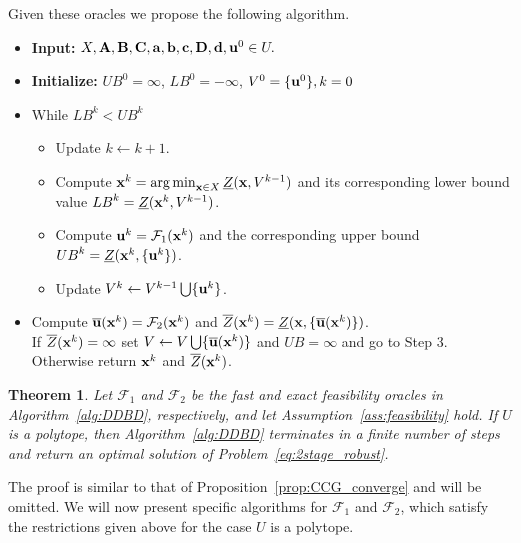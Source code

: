 \documentclass[12pt,x11names]{article}
\newtheorem{theorem}{Theorem} %
\theoremstyle{definition}
\newcommand{\ba}{{\bf a}}
\newcommand{\bb}{{\bf b}}
\newcommand{\bc}{{\bf c}}
\newcommand{\bd}{{\bf d}}
\newcommand{\bu}{{\bf u}}
\newcommand{\bx}{{\bf x}}
\newcommand{\bba}{{\bf A}}
\newcommand{\bbb}{{\bf B}}
\newcommand{\bbc}{{\bf C}}
\newcommand{\bbd}{{\bf D}}
\DeclareMathOperator*{\argmin}{arg\,min}
\begin{document}
Given these oracles we propose the following algorithm. %
\begin{algorithm}\caption{Duality Driven Bender Decomposition (DDBD)}\label{alg:DDBD}
		\begin{itemize}
				\item[$\rm{(1)}$] {\bf Input:} $X,\bba,\bbb,\bbc,\ba,\bb,\bc,\bbd,\bd,\bu^0\in U.$
			    \item[$\rm{(2)}$] {\bf Initialize:} ${UB}^0=\infty$, ${LB}^0=-\infty$, $V^0=\{\bu^0\}, k=0$
			    \item[$\rm{(3)}$] While ${LB}^k< {UB}^k$
			    \begin{itemize}
			        \item[$\rm{(a)}$] Update $k\leftarrow k+1$.
			        \item[$\rm{(b)}$] Compute $\bx^k=\argmin_{\bx\in X} \underline{Z}(\bx,V^{k-1})$ and its corresponding lower bound value ${LB}^k=\underline{Z}(\bx^k,V^{k-1})$.
			        \item[$\rm{(c)}$] Compute $\bu^{k}=\mathcal{F}_1(\bx^k)$ and the corresponding upper bound ${{UB}^k=\underline{Z}(\bx^k,\{\bu^k\})}$.
			        \item[$\rm{(d)}$] Update $V^{k}\leftarrow V^{k-1}\bigcup\{\bu^{k}\}$.           
			     \end{itemize}
			     \item[$\rm{(4)}$] Compute $\overline{\bu}(\bx^k)=\mathcal{F}_2(\bx^k)$ and $\overline{Z}(\bx^k)=\underline{Z}(\bx,\{\overline{\bu}(\bx^k)\})$.\\
			     If $\overline{Z}(\bx^k)=\infty$
			     set $V\leftarrow V\bigcup\{\overline{\bu}(\bx^k)\}$ and $UB=\infty$ and go to Step 3.  
			     Otherwise return $\bx^k$ and $\overline{Z}(\bx^k)$.      		
        \end{itemize} 
\end{algorithm}

\begin{theorem}
Let $\mathcal{F}_1$ and $\mathcal{F}_2$ be the fast and exact feasibility oracles in Algorithm~\ref{alg:DDBD}, respectively, and let Assumption~\ref{ass:feasibility} hold. %
If $U$ is a polytope, then Algorithm~\ref{alg:DDBD} terminates in a finite number of steps and return an optimal solution of Problem~\eqref{eq:2stage_robust}. 
\end{theorem}
The proof is similar to that of Proposition~\ref{prop:CCG_converge} and will be omitted.
We will now present specific algorithms for $\mathcal{F}_1$ and $\mathcal{F}_2$, which satisfy the restrictions given above for the case $U$ is a polytope.
\end{document}
